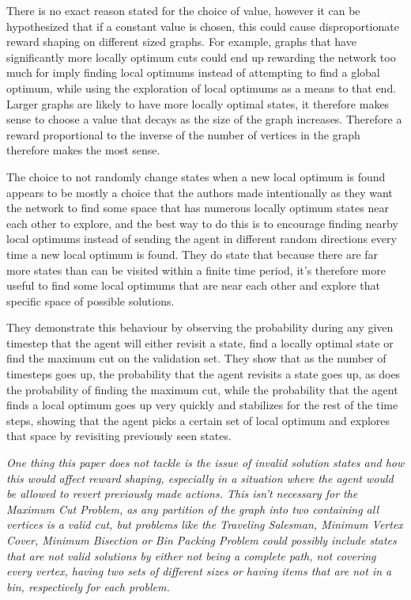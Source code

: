 \documentclass{article}
\begin{document}
There is no exact reason stated for the choice of value, however it can be hypothesized that if a constant value is chosen, this could cause disproportionate reward shaping on different sized graphs. For example, graphs that have significantly more locally optimum cuts could end up rewarding the network too much for imply finding local optimums instead of attempting to find a global optimum, while using the exploration of local optimums as a means to that end. Larger graphs are likely to have more locally optimal states, it therefore makes sense to choose a value that decays as the size of the graph increases. Therefore a reward proportional to the inverse of the number of vertices in the graph therefore makes the most sense. 

The choice to not randomly change states when a new local optimum is found appears to be mostly a choice that the authors made intentionally as they want the network to find some space that has numerous locally optimum states near each other to explore, and the best way to do this is to encourage finding nearby local optimums instead of sending the agent in different random directions every time a new local optimum is found. They do state that because there are far more states than can be visited within a finite time period, it's therefore more useful to find some local optimums that are near each other and explore that specific space of possible solutions.

They demonstrate this behaviour by observing the probability during any given timestep that the agent will either revisit a state, find a locally optimal state or find the maximum cut on the validation set. They show that as the number of timesteps goes up, the probability that the agent revisits a state goes up, as does the probability of finding the maximum cut, while the probability that the agent finds a local optimum goes up very quickly and stabilizes for the rest of the time steps, showing that the agent picks a certain set of local optimum and explores that space by revisiting previously seen states.

\textit{One thing this paper does not tackle is the issue of invalid solution states and how this would affect reward shaping, especially in a situation where the agent would be allowed to revert previously made actions. This isn't necessary for the Maximum Cut Problem, as any partition of the graph into two containing all vertices is a valid cut, but problems like the Traveling Salesman, Minimum Vertex Cover, Minimum Bisection or Bin Packing Problem could possibly include states that are not valid solutions by either not being a complete path, not covering every vertex, having two sets of different sizes or having items that are not in a bin, respectively for each problem.}
\end{document}
